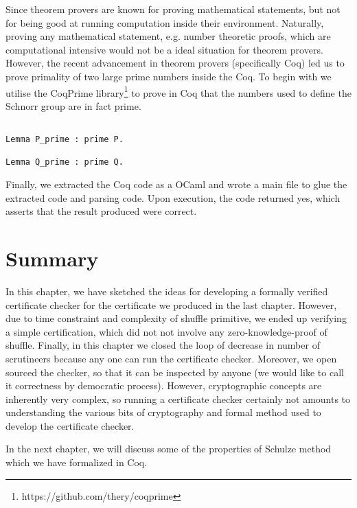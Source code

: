 Since theorem provers are known for proving mathematical statements, but not for being good at running 
computation inside their environment. Naturally, proving any mathematical statement, e.g. number 
theoretic proofs, which are computational intensive would not be a ideal situation for theorem provers. 
However, the recent advancement in theorem provers (specifically Coq) led
us to prove primality of two large prime numbers inside the Coq.
To begin with we utilise the CoqPrime
library\footnote{https://github.com/thery/coqprime} to prove in Coq that the
numbers used to define the Schnorr group are
in fact prime.
\begin{lstlisting}[frame=single,basicstyle=\ttfamily\scriptsize]

Lemma P_prime : prime P.

Lemma Q_prime : prime Q.

\end{lstlisting}


Finally, we extracted the Coq code as a OCaml and wrote a main file to glue the 
extracted code and parsing code. Upon execution, the code returned 
yes, which asserts that the result produced were correct. 


\section{Summary}
In this chapter, we have sketched the ideas for developing a formally verified certificate checker
for the certificate we produced in the last chapter. However, due to time constraint and 
complexity of shuffle primitive, 
we ended up verifying a simple certification, which did not not involve any zero-knowledge-proof 
of shuffle.  Finally, in this chapter we closed the loop of decrease in number of scrutineers because 
any one can run the certificate checker. Moreover, we open sourced the checker, so 
that it can be inspected by anyone (we would like to call it correctness by democratic 
process).  However, cryptographic concepts are 
inherently very complex, so running a certificate checker certainly not amounts 
to understanding the various bits of cryptography and formal method used to develop the
certificate checker. 

In the next chapter, we will discuss some of the properties of Schulze method which we have 
formalized in Coq. 











































   
   
   
   
   
   